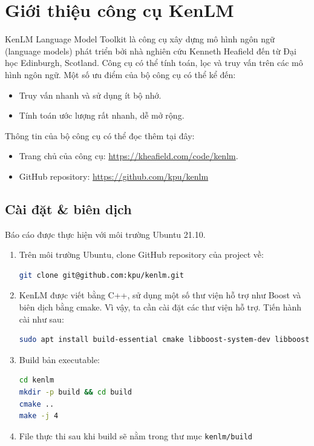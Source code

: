 \documentclass[12pt]{article}
\begin{document}
\tableofcontents
\pagebreak

\section{Giới thiệu công cụ KenLM}
KenLM Language Model Toolkit là công cụ xây dựng mô hình ngôn ngữ (language models) phát triển bởi nhà nghiên cứu Kenneth Heafield đến từ Đại học Edinburgh, Scotland. Công cụ có thể tính toán, lọc và truy vấn trên các mô hình ngôn ngữ. Một số ưu điểm của bộ công cụ có thể kể đến:
\begin{itemize}
\item Truy vấn nhanh và sử dụng ít bộ nhớ.\cite{heafield-2011-kenlm}
\item Tính toán ước lượng rất nhanh, dễ mở rộng.\cite{heafield-etal-2013-scalable}
\end{itemize}
Thông tin của bộ công cụ có thể đọc thêm tại đây:
\begin{itemize}
\item Trang chủ của công cụ: \href{https://kheafield.com/code/kenlm}{https://kheafield.com/code/kenlm}.
\item GitHub repository: \href{https://github.com/kpu/kenlm}{https://github.com/kpu/kenlm}
\end{itemize}
\subsection{Cài đặt \& biên dịch}
Báo cáo được thực hiện với môi trường Ubuntu 21.10.
\begin{enumerate}
\item Trên môi trường Ubuntu, clone GitHub repository của project về:
\begin{lstlisting}[language=sh]
git clone git@github.com:kpu/kenlm.git
\end{lstlisting}

\item KenLM được viết bằng C++, sử dụng một số thư viện hỗ trợ như Boost và biên dịch bằng cmake. Vì vậy, ta cần cài đặt các thư viện hỗ trợ. Tiến hành cài như sau:
\begin{lstlisting}[language=sh]
sudo apt install build-essential cmake libboost-system-dev libboost-thread-dev libboost-program-options-dev libboost-test-dev libeigen3-dev zlib1g-dev libbz2-dev liblzma-dev
\end{lstlisting}

\item Build bản executable:
\begin{lstlisting}[language=sh]
cd kenlm
mkdir -p build && cd build
cmake ..
make -j 4
\end{lstlisting}
\item File thực thi sau khi build sẽ nằm trong thư mục \texttt{kenlm/build}
\end{enumerate}
\end{document}
